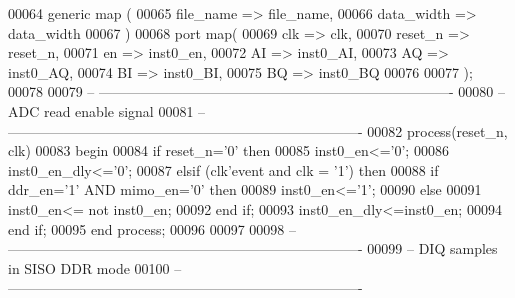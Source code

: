 \begin{DoxyCode}
00064 \textcolor{keywordflow}{generic} \textcolor{keywordflow}{map} (
00065     file_name   => file_name,
00066     data_width  => data_width
00067 \textcolor{vhdlchar}{)}
00068 \textcolor{keywordflow}{port} \textcolor{keywordflow}{map}(
00069     clk     => clk,
00070     reset_n => reset_n, 
00071     en          => inst0_en, 
00072     AI          => inst0_AI, 
00073     AQ          => inst0_AQ, 
00074     BI          => inst0_BI, 
00075     BQ          => inst0_BQ
00076     
00077     \textcolor{vhdlchar}{)};
00078 
00079 \textcolor{keyword}{-- ----------------------------------------------------------------------------}
00080 \textcolor{keyword}{-- ADC read enable signal}
00081 \textcolor{keyword}{-- ----------------------------------------------------------------------------}
00082   \textcolor{keywordflow}{process}(reset_n, clk)
00083 \textcolor{vhdlkeyword}{    begin}
00084       \textcolor{keywordflow}{if} \textcolor{vhdlchar}{reset_n}\textcolor{vhdlchar}{=}\textcolor{vhdlchar}{'}\textcolor{vhdllogic}{}\textcolor{vhdllogic}{0}\textcolor{vhdlchar}{'} \textcolor{keywordflow}{then}
00085             inst0\_en<='0';
00086             inst0\_en\_dly<='0'; 
00087       \textcolor{keywordflow}{elsif} \textcolor{vhdlchar}{(}\textcolor{vhdlchar}{clk}\textcolor{vhdlchar}{'}\textcolor{vhdlkeyword}{event} \textcolor{keywordflow}{and} \textcolor{vhdlchar}{clk} \textcolor{vhdlchar}{=} \textcolor{vhdlchar}{'}\textcolor{vhdllogic}{}\textcolor{vhdllogic}{1}\textcolor{vhdlchar}{'}\textcolor{vhdlchar}{)} \textcolor{keywordflow}{then}
00088             \textcolor{keywordflow}{if} \textcolor{vhdlchar}{ddr_en}\textcolor{vhdlchar}{=}\textcolor{vhdlchar}{'}\textcolor{vhdllogic}{}\textcolor{vhdllogic}{1}\textcolor{vhdlchar}{'} \textcolor{keywordflow}{AND} \textcolor{vhdlchar}{mimo_en}\textcolor{vhdlchar}{=}\textcolor{vhdlchar}{'}\textcolor{vhdllogic}{}\textcolor{vhdllogic}{0}\textcolor{vhdlchar}{'} \textcolor{keywordflow}{then}
00089                 inst0\_en<='1'; 
00090             \textcolor{keywordflow}{else} 
00091                 inst0\_en<= \textcolor{keywordflow}{not} inst0\_en;
00092             \textcolor{keywordflow}{end} \textcolor{keywordflow}{if};
00093             inst0\_en\_dly<=inst0\_en; 
00094         \textcolor{keywordflow}{end} \textcolor{keywordflow}{if};
00095     \textcolor{keywordflow}{end} \textcolor{keywordflow}{process};
00096 
00097 
00098 \textcolor{keyword}{-- ----------------------------------------------------------------------------}
00099 \textcolor{keyword}{-- DIQ samples in SISO DDR mode}
00100 \textcolor{keyword}{-- ----------------------------------------------------------------------------}

\end{DoxyCode}
